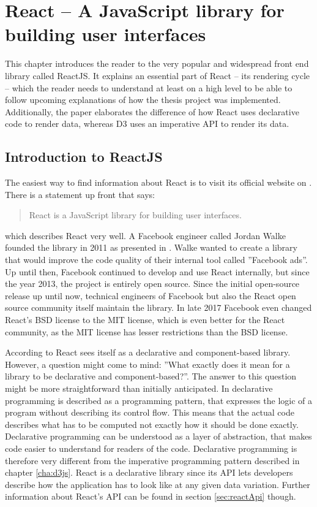 \chapter{React – A JavaScript library for building user interfaces}
\label{cha:react}

This chapter introduces the reader to the very popular and widespread front end library called ReactJS. It explains an essential part of React -- its rendering cycle -- which the reader needs to understand at least on a high level to be able to follow upcoming explanations of how the thesis project was implemented. Additionally, the paper elaborates the difference of how React uses declarative code to render data, whereas D3 uses an imperative API to render its data.

\section{Introduction to ReactJS}

The easiest way to find information about React is to visit its official website on \cite{React}. There is a statement up front that says: \begin{quote}\begin{english}React is a JavaScript library for building user interfaces.\end{english}\end{quote} which describes React very well. A Facebook engineer called Jordan Walke founded the library in 2011 as presented in \cite[05:30]{ReactFoundingVideo}. Walke wanted to create a library that would improve the code quality of their internal tool called ''Facebook ads''. Up until then, Facebook continued to develop and use React internally, but since the year 2013, the project is entirely open source. Since the initial open-source release up until now, technical engineers of Facebook but also the React open source community itself maintain the library. In late 2017 Facebook even changed React's BSD license to the MIT license, which is even better for the React community, as the MIT license has lesser restrictions than the BSD license.

According to \cite{React} React sees itself as a declarative and component-based library. However, a question might come to mind: ''What exactly does it mean for a library to be declarative and component-based?''. The answer to this question might be more straightforward than initially anticipated. In \cite{lloyd1994practical} declarative programming is described as a programming pattern, that expresses the logic of a program without describing its control flow. This means that the actual code describes what has to be computed not exactly how it should be done exactly. Declarative programming can be understood as a layer of abstraction, that makes code easier to understand for readers of the code. Declarative programming is therefore very different from the imperative programming pattern described in chapter \ref{cha:d3js}. React is a declarative library since its API lets developers describe how the application has to look like at any given data variation. Further information about React's API can be found in section \ref{sec:reactApi} though.

